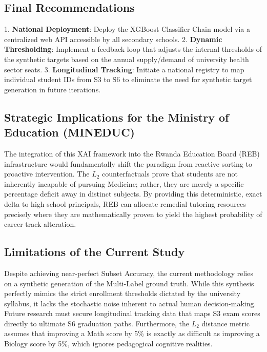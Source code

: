 \subsection{Final Recommendations}
1. \textbf{National Deployment}: Deploy the XGBoost \parencite{chen2016xgboost} Classifier Chain \parencite{read2011classifier} model via a centralized web API accessible by all secondary schools.
2. \textbf{Dynamic Thresholding}: Implement a feedback loop that adjusts the internal thresholds of the synthetic targets based on the annual supply/demand of university health sector seats.
3. \textbf{Longitudinal Tracking}: Initiate a national registry to map individual student IDs from S3 to S6 to eliminate the need for synthetic target generation in future iterations.





\subsection{Strategic Implications for the Ministry of Education (MINEDUC)}
The integration of this XAI framework into the Rwanda Education Board (REB) infrastructure would fundamentally shift the paradigm from reactive sorting to proactive intervention. The $L_2$ counterfactuals prove that students are not inherently incapable of pursuing Medicine; rather, they are merely a specific percentage deficit away in distinct subjects. By providing this deterministic, exact delta to high school principals, REB can allocate remedial tutoring resources precisely where they are mathematically proven to yield the highest probability of career track alteration.

\subsection{Limitations of the Current Study}
Despite achieving near-perfect Subset Accuracy, the current methodology relies on a synthetic generation of the Multi-Label \parencite{tsoumakas2007multi} ground truth. While this synthesis perfectly mimics the strict enrollment thresholds dictated by the university syllabus, it lacks the stochastic noise inherent to actual human decision-making. Future research must secure longitudinal tracking data that maps S3 exam scores directly to ultimate S6 graduation paths. Furthermore, the $L_2$ distance metric assumes that improving a Math score by 5\% is exactly as difficult as improving a Biology score by 5\%, which ignores pedagogical cognitive realities.

